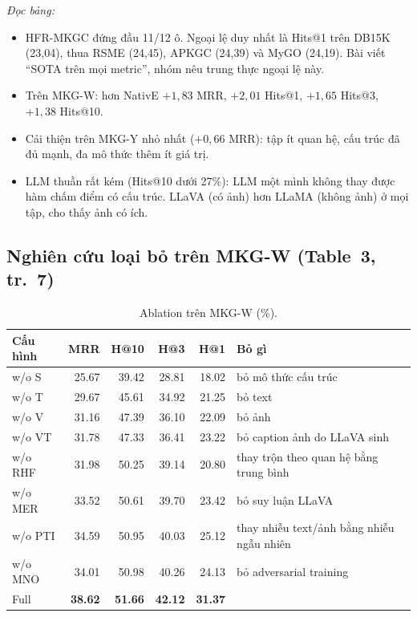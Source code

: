 \documentclass[11pt,a4paper]{article}
\begin{document}
\textit{Đọc bảng:}
\begin{itemize}
\item HFR-MKGC đứng đầu 11/12 ô. Ngoại lệ duy nhất là Hits@1 trên DB15K (23,04), thua RSME (24,45), APKGC (24,39) và MyGO (24,19). Bài viết ``SOTA trên mọi metric'', nhóm nêu trung thực ngoại lệ này.
\item Trên MKG-W: hơn NativE $+1{,}83$ MRR, $+2{,}01$ Hits@1, $+1{,}65$ Hits@3, $+1{,}38$ Hits@10.
\item Cải thiện trên MKG-Y nhỏ nhất ($+0{,}66$ MRR): tập ít quan hệ, cấu trúc đã đủ mạnh, đa mô thức thêm ít giá trị.
\item LLM thuần rất kém (Hits@10 dưới 27\%): LLM một mình không thay được hàm chấm điểm có cấu trúc. LLaVA (có ảnh) hơn LLaMA (không ảnh) ở mọi tập, cho thấy ảnh có ích.
\end{itemize}

\subsection{Nghiên cứu loại bỏ trên MKG-W (Table~3, tr.~7)}

\begin{table}[H]
\centering\small
\caption{Ablation trên MKG-W (\%).}
\label{tab:abl}
\begin{tabular}{@{}lrrrrl@{}}
\toprule
Cấu hình & MRR & H@10 & H@3 & H@1 & Bỏ gì\\
\midrule
w/o S & 25.67 & 39.42 & 28.81 & 18.02 & bỏ mô thức cấu trúc\\
w/o T & 29.67 & 45.61 & 34.92 & 21.25 & bỏ text\\
w/o V & 31.16 & 47.39 & 36.10 & 22.09 & bỏ ảnh\\
w/o VT & 31.78 & 47.33 & 36.41 & 23.22 & bỏ caption ảnh do LLaVA sinh\\
w/o RHF & 31.98 & 50.25 & 39.14 & 20.80 & thay trộn theo quan hệ bằng trung bình\\
w/o MER & 33.52 & 50.61 & 39.70 & 23.42 & bỏ suy luận LLaVA\\
w/o PTI & 34.59 & 50.95 & 40.03 & 25.12 & thay nhiễu text/ảnh bằng nhiễu ngẫu nhiên\\
w/o MNO & 34.01 & 50.98 & 40.26 & 24.13 & bỏ adversarial training\\
\midrule
Full & \textbf{38.62} & \textbf{51.66} & \textbf{42.12} & \textbf{31.37} & \\
\bottomrule
\end{tabular}
\end{table}
\end{document}
